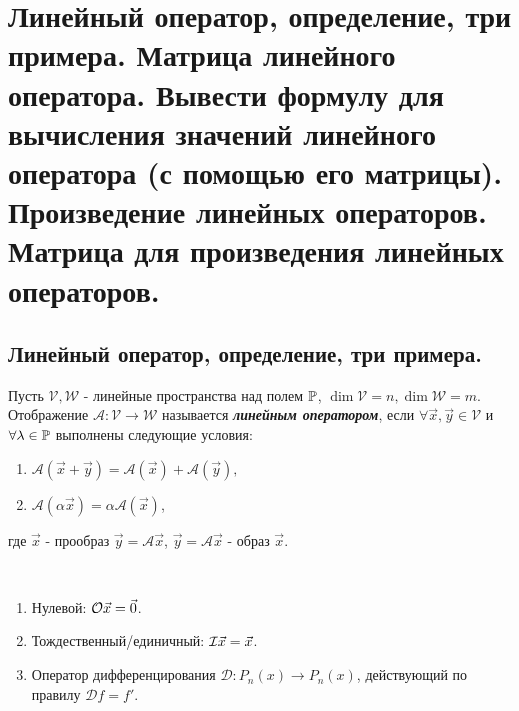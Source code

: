 \section{
    Линейный оператор, определение, три 
    примера. Матрица линейного оператора. 
    Вывести формулу для вычисления значений 
    линейного оператора (с помощью его 
    матрицы). Произведение линейных 
    операторов. Матрица для произведения 
    линейных операторов.
 }

 \subsection{
    Линейный оператор, определение, три 
    примера.
 }

\begin{definition}
    Пусть $\mathcal{V}, \mathcal{W}$ - 
    линейные пространства над полем $\mathbb{P}$, 
    $\dim \mathcal{V} = n, \dim \mathcal{W} = m$. 
    Отображение $\mathscr{A} \colon \mathcal{V} 
    \to \mathcal{W}$ называется 
    \textit{\textbf{линейным оператором}}, 
    если $\forall \vec{x}, \vec{y} \in 
    \mathcal{V}$ и $\forall \lambda \in \mathbb{P}$ 
    выполнены следующие условия:
    
    \begin{enumerate}[nosep]
        \item $\mathscr{A}(\vec{x} + \vec{y}) = 
        \mathscr{A}(\vec{x}) + \mathscr{A}(\vec{y}),$
        \item $\mathscr{A}(\alpha\vec{x}) = 
        \alpha\mathscr{A}(\vec{x})$,
    \end{enumerate}
    где $\vec{x}$ - прообраз $\vec{y} = \mathscr{A}\vec{x}$,
    $\vec{y} = \mathscr{A}\vec{x}$ - образ $\vec{x}$.
\end{definition}

\begin{example}~

    \begin{enumerate}[nosep]
        \item Нулевой: $\mathcal{O}\vec{x} = \vec{0}$.
        \item Тождественный/единичный: 
        $\mathcal{I}\vec{x} = \vec{x}$.
        \item Оператор дифференцирования $\mathscr{D} \colon P_n(x) \to P_n(x)$, действующий по правилу $\mathscr{D}f = f'$.
    \end{enumerate}
\end{example}


\newpage


